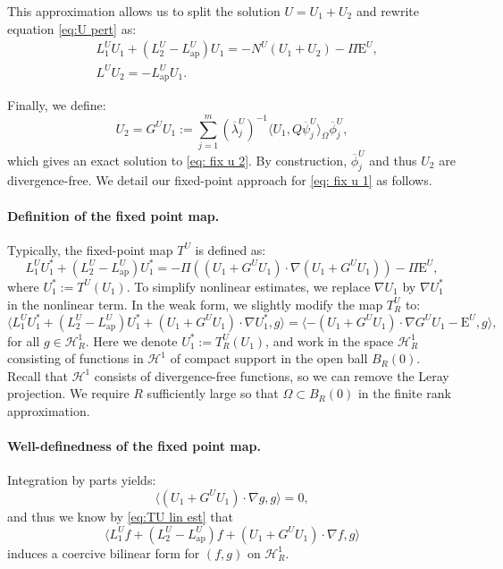 \documentclass[11pt,a4paper]{article}
\numberwithin{equation}{section}
\newcommand{\Epsilon}{\mathrm{E}}
\newcommand{\assign}{:=}
\newcommand{\tmop}[1]{\ensuremath{\operatorname{#1}}}
\begin{document}
This approximation allows us to split the solution $U = U_1 + U_2$ and
rewrite equation \eqref{eq:U pert} as:
\begin{align}
  &L_1^U U_1 + (L_2^U - L_{\tmop{ap}}^{U}) U_1  =  -N^U (U_1 + U_2) -
  \Pi\Epsilon^U,\label{eq: fix u 1} \\
  &L^U U_2  =  -L_{\tmop{ap}}^{U} U_1 . \label{eq: fix u 2}
\end{align}






Finally, we define:
\begin{equation}
    U_2 = G^{U} U_1 \assign \sum_{j = 1}^m (\overline{\lambda}_j^U)^{-1} \langle U_1, Q\overline\psi_j^U \rangle_{
   \Omega} \overline\phi_j^U  , \label{nl def u}
\end{equation} 
which gives an exact solution to \eqref{eq: fix u 2}.
   By construction, $\overline\phi_j^U$ and thus $U_2$ are divergence-free.
We detail our fixed-point approach for \eqref{eq: fix u 1} as follows. 

\paragraph{Definition of the fixed point map.} Typically, the fixed-point map
$T^U$ is defined as:
\[ L_1^U U_1^{\ast} + (L_2^U - L_{\tmop{ap}}^{U}) U_1^{\ast} = -\Pi ((U_1 +
   G^{U} U_1) \cdot \nabla (U_1 + G^{U} U_1)) - \Pi\Epsilon^U , \]
where $U_1^{\ast} \assign T^U (U_1)$. To simplify nonlinear estimates, we replace $\nabla U_1$ by $\nabla U_1^{\ast}$ in the nonlinear term. In the weak form, we slightly
modify the map $T^U_R$ to:
\begin{equation}  \langle L_1^U U_1^{\ast} + (L_2^U - L_{\tmop{ap}}^{U}) U_1^{\ast}+(U_1 +
   G^{U} U_1) \cdot \nabla U_1^{\ast} , g \rangle =  \langle-(U_1 +
   G^{U} U_1) \cdot \nabla   G^{U} U_1 - \Epsilon^U,g \rangle, \label{eq:Ustar def}
\end{equation}
 for all $g\in \mathcal{H}^1_R$. Here we denote $U_1^{\ast} \assign T^U_R (U_1)$, and 
  work in the space $ \mathcal{H}^1_R$ consisting of functions in $ \mathcal{H}^1$ of compact support in the open ball $B_R(0)$. Recall that $ \mathcal{H}^1$ consists of divergence-free functions, so we can remove the Leray projection. We require $R$ sufficiently large so that $\Omega\subset B_R(0)$ in the finite rank approximation. 

     \paragraph{Well-definedness of the fixed point map.} 
     Integration by parts yields:
\begin{equation} \langle  (U_1 +G^{U} U_1) \cdot \nabla g, g \rangle = 0,
\label{eq:Ustar canq}
\end{equation}
and thus we know by \eqref{eq:TU lin est} that \begin{equation}
    \langle L_1^Uf + (L_2^U - L_{\tmop{ap}}^{U})f+(U_1 + G^{U} U_1) \cdot \nabla f,g\rangle\label{lax-mil fix}
\end{equation} induces a coercive bilinear form for $(f,g)$ on $\mathcal{H}^1_R$.
\end{document}
